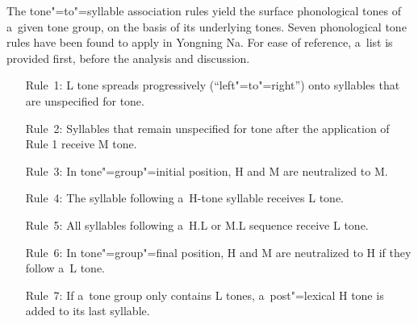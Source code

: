 
The tone"=to"=syllable association rules yield the surface phonological tones of a~given tone
group, on the basis of its underlying tones. Seven phonological tone rules have been found to apply in Yongning Na. For ease of reference, a~list is provided first, before the analysis and discussion.

	\begin{enumerate}[leftmargin=2cm, itemsep=0pt, labelwidth=\widthof{Rule~1:}]%
		\item[Rule~1:] L tone spreads progressively (“left"=to"=right”) onto syllables that are unspecified for tone.
		\item[Rule~2:] Syllables that remain unspecified for tone after the application of Rule 1 receive M tone.
		\item[Rule~3:] In tone"=group"=initial position, H and M are neutralized to M.
		\item[Rule~4:] The syllable following a~H-tone syllable receives L tone.
		\item[Rule~5:] All syllables following a~H.L or M.L sequence receive L tone.
		\item[Rule~6:] In tone"=group"=final position, H and M are neutralized to H if they follow a~L tone.
		\item[Rule~7:] If a~tone group only contains L tones, a~post"=lexical H tone is added to its last syllable.
	\end{enumerate}


